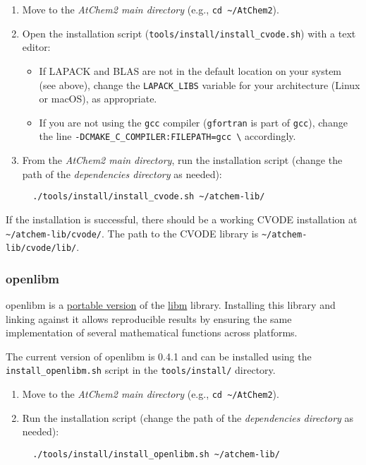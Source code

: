 \begin{enumerate}
\item Move to the \emph{AtChem2 main directory} (e.g., \texttt{cd\
    \textasciitilde{}/AtChem2}).
\item Open the installation script
  (\texttt{tools/install/install\_cvode.sh}) with a text editor:
  \begin{itemize}
  \item If LAPACK and BLAS are not in the default location on your
    system (see above), change the \texttt{LAPACK\_LIBS} variable for
    your architecture (Linux or macOS), as appropriate.
  \item If you are not using the \texttt{gcc} compiler
    (\texttt{gfortran} is part of \texttt{gcc}), change the line
    \texttt{-DCMAKE\_C\_COMPILER:FILEPATH=gcc\ \textbackslash{}}
    accordingly.
  \end{itemize}
\item From the \emph{AtChem2 main directory}, run the installation
  script (change the path of the \emph{dependencies directory} as
  needed):
  \begin{verbatim}
  ./tools/install/install_cvode.sh ~/atchem-lib/
  \end{verbatim}
\end{enumerate}

If the installation is successful, there should be a working CVODE
installation at
\texttt{\textasciitilde{}/atchem-lib/cvode/}. The path to the
CVODE library is
\texttt{\textasciitilde{}/atchem-lib/cvode/lib/}.

\subsubsection{openlibm} \label{openlibm}

openlibm is a \href{http://openlibm.org/}{portable version} of the
\href{https://en.wikipedia.org/wiki/C_mathematical_functions}{libm}
library. Installing this library and linking against it allows
reproducible results by ensuring the same implementation of several
mathematical functions across platforms.

The current version of openlibm is 0.4.1 and can be installed using
the \texttt{install\_openlibm.sh} script in the
\texttt{tools/install/} directory.

\begin{enumerate}
\item Move to the \emph{AtChem2 main directory} (e.g., \texttt{cd\
    \textasciitilde{}/AtChem2}).
\item Run the installation script (change the path of the
  \emph{dependencies directory} as needed):
  \begin{verbatim}
  ./tools/install/install_openlibm.sh ~/atchem-lib/
  \end{verbatim}
\end{enumerate}


